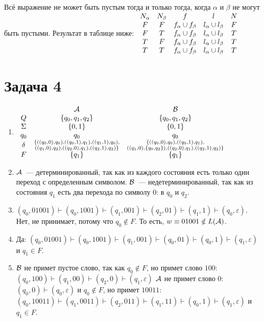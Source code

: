 \documentclass[a4paper]{article}
\begin{document}
\begin{enumerate}
Всё выражение не может быть пустым тогда и только тогда, когда $\alpha$ и $\beta$ не могут быть пустыми. Результат в таблице ниже:
$
\newline
\begin{array}{ccccc}
N_\alpha & N_\beta & f & l & N\\
F & F & f_\alpha \cup f_\beta & l_\alpha \cup l_\beta & F \\
F & T & f_\alpha \cup f_\beta & l_\alpha \cup l_\beta & T\\
T & F & f_\alpha \cup f_\beta & l_\alpha \cup l_\beta & T\\
T & T & f_\alpha \cup f_\beta & l_\alpha \cup l_\beta & T\\
\end{array}
$
\end{enumerate}
\section*{Задача 4}
\begin{enumerate}[1.]
\item $\begin{array}{ccc}
& \cal A & \cal B \\
Q & \{q_0,q_1,q_2\} & \{q_0,q_1,q_2\}\\
\Sigma & \{0,1\} & \{0,1\}\\
q_0 & q_0 & q_0\\
\delta & \substack{\{((q_0,0),q_0),((q_0,1),q_1),((q_1,1),q_0),\\((q_1,0),q_2),((q_2,0),q_1),((q_2,1),q_2)\}} & \substack{\{((q_0,0),q_0),((q_0,1),q_1),\\((q_1,0),\{q_0,q_2\}),((q_2,0),q_1),((q_2,1),q_2)\}}\\
F & \{q_1\} & \{q_1\}\\
\end{array}$
\item $\cal A$~--- детерминированный, так как из каждого состояния есть только один переход с определенным символом.\newline
$\cal B$~--- недетерминированный, так как из состояния $q_1$ есть два перехода по символу $0$: в $q_0$ и $q_2$.
\item $(q_0,01001)\vdash(q_0,1001)\vdash(q_1,001)\vdash(q_2,01)\vdash(q_1,1)\vdash(q_0,\varepsilon)$. Нет, не принимает, потому что $q_0\notin F$. То есть, $w\equiv 01001\notin L(\cal A)$.
\item Да: $(q_0,01001)\vdash(q_0,1001)\vdash(q_1,001)\vdash(q_0,01)\vdash(q_0,1)\vdash(q_1,\varepsilon)$ и $q_1\in F$.
\item $\cal B$ не примет пустое слово, так как $q_0\notin F$, но примет слово $100$: $(q_0,100)\vdash(q_1,00)\vdash(q_2,0)\vdash(q_1,\varepsilon)$\newline
$\cal A$ не примет слово $0$: $(q_0,0)\vdash(q_0,\varepsilon)$ и $q_0\notin F$, но примет $10011$: $(q_0,10011)\vdash(q_1,0011)\vdash(q_2,011)\vdash(q_1,11)\vdash(q_0,1)\vdash(q_1,\varepsilon)$ и $q_1\in F$.
\end{enumerate}
\newpage
\end{document}
